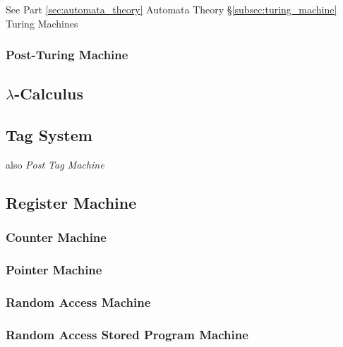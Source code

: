 \documentclass{article}
\begin{document}
See Part \ref{sec:automata_theory} Automata Theory
\S\ref{subsec:turing_machine} Turing Machines

\subsubsection{Post-Turing Machine}\label{subsec:post_turing}

\subsection{$\lambda$-Calculus}\label{subsec:lambda_calculus}

\subsection{Tag System}\label{subsec:tag_system}

also \emph{Post Tag Machine}

\subsection{Register Machine}\label{subsec:register_machine}

\subsubsection{Counter Machine}

\subsubsection{Pointer Machine}

\subsubsection{Random Access Machine}

\subsubsection{Random Access Stored Program Machine}
\end{document}
